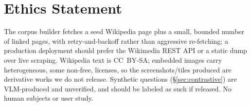 \section*{Ethics Statement}
\label{sec:ethics}

The corpus builder fetches a seed Wikipedia page plus a small, bounded number of linked pages, with retry-and-backoff rather than aggressive re-fetching; a production deployment should prefer the Wikimedia REST API or a static dump over live scraping. Wikipedia text is CC~BY-SA; embedded images carry heterogeneous, some non-free, licenses, so the screenshots/tiles produced are derivative works we do not release. Synthetic questions (\S\ref{sec:contrastive}) are VLM-produced and unverified, and should be labeled as such if released. No human subjects or user study.

